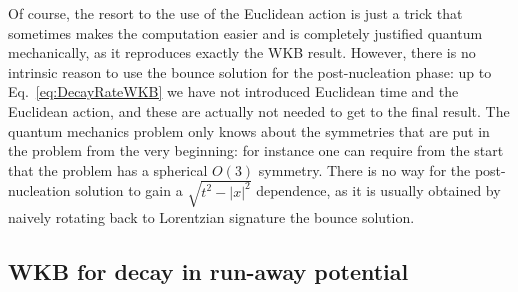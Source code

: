 \documentclass[a4paper,11pt]{article}
\numberwithin{equation}{section}
\begin{document}
Of course, the resort to the use of the Euclidean action is just a trick that sometimes makes the computation easier and is completely justified quantum mechanically, as it reproduces exactly the WKB result. However, there is no intrinsic reason to use the bounce solution for the post-nucleation phase: up to Eq.~\eqref{eq:DecayRateWKB} we have not introduced Euclidean time and the Euclidean action, and these are actually not needed to get to the final result. The quantum mechanics problem only knows about the symmetries that are put in the problem from the very beginning: for instance one can require from the start that the problem has a spherical $O(3)$ symmetry. There is no way for the post-nucleation solution to gain a $\sqrt{t^2 - |x|^2}$ dependence, as it is usually obtained by naively rotating back to Lorentzian signature the bounce solution.

\subsection{WKB for decay in run-away potential}
\end{document}
